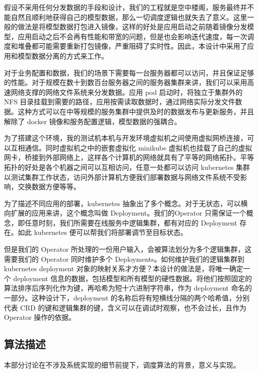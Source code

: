 假设不采用任何分发数据的手段和设计，我们的工程就是空中楼阁，服务最终并不能自然且顺利地获得自己的模型数据，那么一切调度逻辑也就失去了意义。这里一般的做法是将模型数据打包进入镜像，这样的好处是应用启动之前随着镜像分发模型，应用启动之后不会再有性能和带宽的问题，但是也会影响迭代速度，每一次调度和堆叠都可能需要重新打包镜像，严重阻碍了实时性。因此，本设计中采用了应用和模型数据分离的方式来工作。

对于业务配置和数据，我们的场景下需要每一台服务器都可以访问，并且保证足够的性能。对于规模在数十到数百台服务器之间的服务器集群来讲，我们可以采用高速网络支撑的网络文件系统来分发数据。应用 pod 启动时，将独立于集群外的 NFS 目录挂载到需要的路径，应用按需读取数据时，通过网络实际分发文件数据。这种方式可以在中等规模的服务集群中提供及时的数据发布与更新服务，并且解除了 docker 镜像和服务配置逻辑，模型数据的强耦合。


为了搭建这个环境，我的测试机本机与开发环境虚拟机之间使用虚拟网桥连接，可以互相通信。同时虚拟机之中的嵌套虚拟化 minikube 虚拟机也挂载了自己的虚拟网卡，桥接到外部网络上，这样各个计算机的网络就具有了平等的网络拓扑。平等拓扑的好处是各个机器之间可以互相访问，任意一处都可以访问 kubernetes 集群以测试集群工作状态，访问外部计算机方便我们部署数据与网络文件系统不受影响，交换数据方便等等。


为了描述不同应用的部署，kubernetes 抽象出了多个概念。对于无状态，可以横向扩展的应用来讲，这个概念叫做 Deployment。我们的Operator 只需保证一个概念，即任意时刻，我们所需要在线服务中逻辑集群，都有对应的 Deployment 存在。如此 kubernetes 便可以帮我们将部署调节至目标状态。

但是我们的 Operator 所处理的一份用户输入，会被算法划分为多个逻辑集群，这需要我们的 Operator 同时维护多个 Deployments。如何维护我们的逻辑集群到 kubernetes deployment 对象的映射关系才方便？本设计的做法是，将唯一确定一个 deployment 信息的数据，包括模型和所有模型的硬性数据。将他们按照固定的算法排序后序列化作为键，再哈希为短十六进制字符串，作为 deployment 命名的一部分。这种设计下，deployment 的名称后将有短横线分隔的两个哈希值，分别代表 CRD 的键和逻辑集群的键，含义可以在调试时观察，也不会过长，且作为 Operator 操作的依据。

\subsection{算法描述}

本部分讨论在不涉及系统实现的细节前提下，调度算法的背景，意义与实现。

